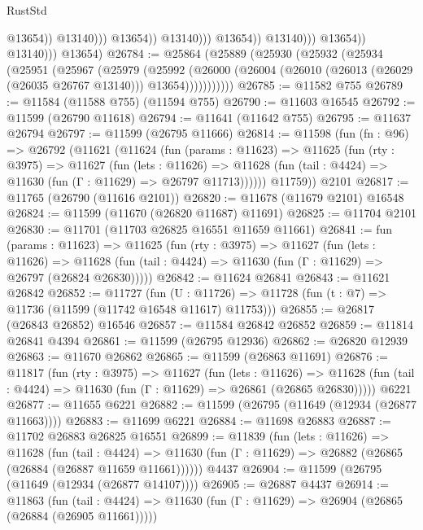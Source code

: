 \begin{lexlean}{RustStd}
\begin{coremodule}
                                              @13654))
                                          @13140)))
                                    @13654))
                                @13140)))
                          @13654))
                      @13140)))
                @13654))
            @13140)))
      @13654)
@26784 := @25864
    (@25889
      (@25930
        (@25932
          (@25934
            (@25951
              (@25967
                (@25979
                  (@25992
                    (@26000
                      (@26004 (@26010 (@26013 (@26029 (@26035 @26767 @13140))) @13654)))))))))))
@26785 := @11582 @755
@26789 := @11584 (@11588 @755) (@11594 @755)
@26790 := @11603 @16545
@26792 := @11599 (@26790 @11618)
@26794 := @11641 (@11642 @755)
@26795 := @11637 @26794
@26797 := @11599 (@26795 @11666)
@26814 := @11598
    (fun (fn : @96) =>
    @26792
      (@11621
        (@11624
          (fun (params : @11623) =>
          @11625
            (fun (rty : @3975) =>
            @11627
              (fun (lets : @11626) =>
              @11628 (fun (tail : @4424) => @11630 (fun (Γ : @11629) => @26797 @11713))))))
        @11759))
    @2101
@26817 := @11765 (@26790 (@11616 @2101))
@26820 := @11678 (@11679 @2101) @16548
@26824 := @11599 (@11670 (@26820 @11687) @11691)
@26825 := @11704 @2101
@26830 := @11701 (@11703 @26825 @16551 @11659 @11661)
@26841 := fun (params : @11623) =>
  @11625
    (fun (rty : @3975) =>
    @11627
      (fun (lets : @11626) =>
      @11628 (fun (tail : @4424) => @11630 (fun (Γ : @11629) => @26797 (@26824 @26830)))))
@26842 := @11624 @26841
@26843 := @11621 @26842
@26852 := @11727
    (fun (U : @11726) => @11728 (fun (t : @7) => @11736 (@11599 (@11742 @16548 @11617) @11753)))
@26855 := @26817 (@26843 @26852) @16546
@26857 := @11584 @26842 @26852
@26859 := @11814 @26841 @4394
@26861 := @11599 (@26795 @12936)
@26862 := @26820 @12939
@26863 := @11670 @26862
@26865 := @11599 (@26863 @11691)
@26876 := @11817
    (fun (rty : @3975) =>
    @11627
      (fun (lets : @11626) =>
      @11628 (fun (tail : @4424) => @11630 (fun (Γ : @11629) => @26861 (@26865 @26830)))))
    @6221
@26877 := @11655 @6221
@26882 := @11599 (@26795 (@11649 (@12934 (@26877 @11663))))
@26883 := @11699 @6221
@26884 := @11698 @26883
@26887 := @11702 @26883 @26825 @16551
@26899 := @11839
    (fun (lets : @11626) =>
    @11628
      (fun (tail : @4424) =>
      @11630 (fun (Γ : @11629) => @26882 (@26865 (@26884 (@26887 @11659 @11661))))))
    @4437
@26904 := @11599 (@26795 (@11649 (@12934 (@26877 @14107))))
@26905 := @26887 @4437
@26914 := @11863
    (fun (tail : @4424) => @11630 (fun (Γ : @11629) => @26904 (@26865 (@26884 (@26905 @11661)))))

\end{coremodule}
\end{lexlean}

